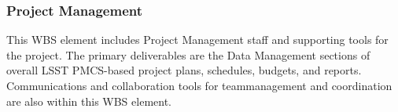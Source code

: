 \subsubsection{Project Management}

This WBS element includes Project Management staff and supporting tools for
the project. The primary deliverables are the Data Management sections of
overall LSST PMCS-based project plans, schedules, budgets, and reports.
Communications and collaboration tools for teammanagement and coordination are
also within this WBS element.
